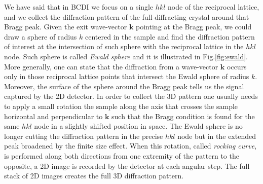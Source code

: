 We have said that in BCDI we focus on a single $hkl$ node of the reciprocal lattice, and we collect the diffraction pattern 
of the full diffracting crystal around that Bragg peak. Given the exit wave-vector $\mathbf{k}$ 
pointing at the Bragg peak, we could draw a sphere of radius $k$ centered in the sample and find the diffraction pattern 
of interest at the intersection of such sphere with the reciprocal lattice in the $hkl$ node.  Such sphere is called 
\textit{Ewald sphere} and it is illustrated in Fig.\ref{fig:ewald}. More generally, one can state that the diffraction 
from a wave-vector $\mathbf{k}$ occurs only in those reciprocal lattice points that intersect the Ewald sphere
of radius $k$. \\
Moreover, the surface of the sphere around the Bragg peak tells us the signal captured by the 2D detector. 
In order to collect the 3D pattern one usually needs to apply a small rotation the sample along the axis that crosses the sample horizontal and 
perpendicular to $\mathbf{k}$ such that the Bragg condition is found for the same $hkl$ node in a slightly shifted position in space. 
The Ewald sphere is no longer cutting the diffraction pattern in the precise $hkl$ node but in the extended peak broadened by the 
finite size effect. When this rotation, called \textit{rocking curve}, is performed along both directions from one extremity of 
the pattern to the opposite, a 2D image is recorded by the detector at each angular step. The full stack of 2D images creates 
the full 3D diffraction pattern. 

